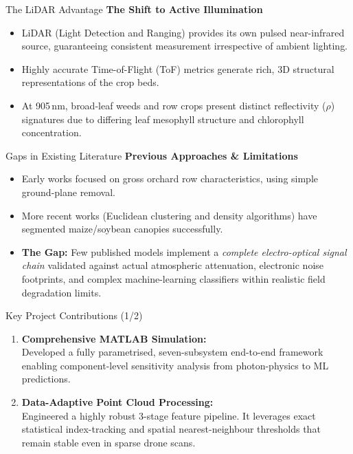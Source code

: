 \documentclass[10pt,aspectratio=169]{beamer}
\begin{document}
\begin{frame}{The LiDAR Advantage}
    \textbf{The Shift to Active Illumination}
    \begin{itemize}
        \item LiDAR (Light Detection and Ranging) provides its own pulsed near-infrared source, guaranteeing consistent measurement irrespective of ambient lighting.
        \item Highly accurate Time-of-Flight (ToF) metrics generate rich, 3D structural representations of the crop beds.
        \item At 905\,nm, broad-leaf weeds and row crops present distinct reflectivity ($\rho$) signatures due to differing leaf mesophyll structure and chlorophyll concentration.
    \end{itemize}
\end{frame}

\begin{frame}{Gaps in Existing Literature}
    \textbf{Previous Approaches \& Limitations}
    \begin{itemize}
        \item Early works focused on gross orchard row characteristics, using simple ground-plane removal.
        \item More recent works (Euclidean clustering and density algorithms) have segmented maize/soybean canopies successfully.
        \item \textbf{The Gap:} Few published models implement a \textit{complete electro-optical signal chain} validated against actual atmospheric attenuation, electronic noise footprints, and complex machine-learning classifiers within realistic field degradation limits.
    \end{itemize}
\end{frame}

\begin{frame}{Key Project Contributions (1/2)}
    \begin{enumerate}
        \item \textbf{Comprehensive MATLAB Simulation:} \\ 
        Developed a fully parametrised, seven-subsystem end-to-end framework enabling component-level sensitivity analysis from photon-physics to ML predictions.
        
        \item \textbf{Data-Adaptive Point Cloud Processing:} \\
        Engineered a highly robust 3-stage feature pipeline. It leverages exact statistical index-tracking and spatial nearest-neighbour thresholds that remain stable even in sparse drone scans.
    \end{enumerate}
\end{frame}
\end{document}
